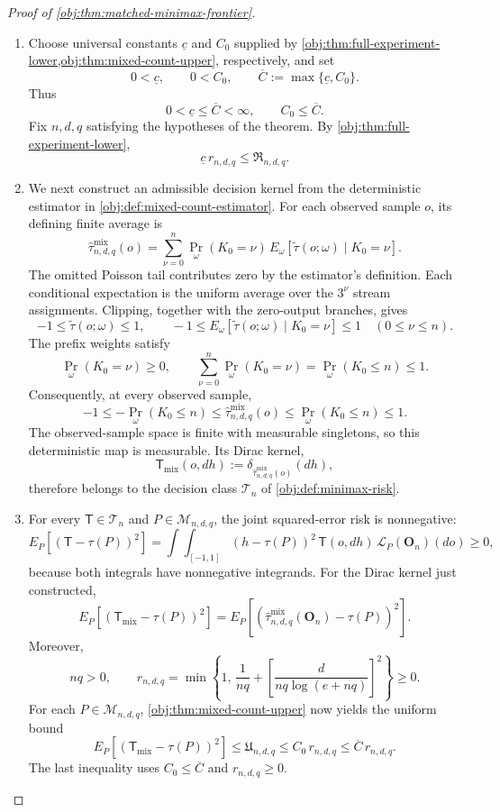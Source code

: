 \documentclass[11pt]{article}
\begin{document}
\begin{proof}[Proof of \cref{obj:thm:matched-minimax-frontier}]
\begin{enumerate}
\item Choose universal constants \(\underline c\) and \(C_0\) supplied by
\cref{obj:thm:full-experiment-lower,obj:thm:mixed-count-upper}, respectively, and set
\[
0<\underline c,\qquad 0<C_0,\qquad
\overline C:=\max\{\underline c,C_0\}.
\]
Thus
\[
0<\underline c\le\overline C<\infty,
\qquad C_0\le\overline C.
\]
Fix \(n,d,q\) satisfying the hypotheses of the theorem.
By \cref{obj:thm:full-experiment-lower},
\[
\underline c\,r_{n,d,q}\le\mathfrak R_{n,d,q}.
\]

\item We next construct an admissible decision kernel from the deterministic estimator in
\cref{obj:def:mixed-count-estimator}. For each observed sample \(o\), its defining finite average is
\[
\widehat\tau^{\mathrm{mix}}_{n,d,q}(o)
=
\sum_{\nu=0}^{n}
\Pr_\omega(K_0=\nu)\,
E_\omega\!\left[
\widetilde\tau(o;\omega)\mid K_0=\nu
\right].
\]
The omitted Poisson tail contributes zero by the estimator's definition.
Each conditional expectation is the uniform average over the \(3^\nu\) stream assignments.
Clipping, together with the zero-output branches, gives
\[
-1\le \widetilde\tau(o;\omega)\le1,
\qquad
-1\le
E_\omega\!\left[
\widetilde\tau(o;\omega)\mid K_0=\nu
\right]
\le1
\quad(0\le\nu\le n).
\]
The prefix weights satisfy
\[
\Pr_\omega(K_0=\nu)\ge0,\qquad
\sum_{\nu=0}^{n}\Pr_\omega(K_0=\nu)
=\Pr_\omega(K_0\le n)\le1.
\]
Consequently, at every observed sample,
\[
-1
\le-\Pr_\omega(K_0\le n)
\le\widehat\tau^{\mathrm{mix}}_{n,d,q}(o)
\le\Pr_\omega(K_0\le n)
\le1.
\]
The observed-sample space is finite with measurable singletons, so this deterministic map is measurable. Its Dirac kernel,
\[
\mathsf T_{\mathrm{mix}}(o,dh)
:=
\delta_{\widehat\tau^{\mathrm{mix}}_{n,d,q}(o)}(dh),
\]
therefore belongs to the decision class \(\mathcal T_n\) of
\cref{obj:def:minimax-risk}.

\item For every \(\mathsf T\in\mathcal T_n\) and \(P\in\mathcal M_{n,d,q}\), the joint squared-error risk is nonnegative:
\[
E_P\!\left[(\mathsf T-\tau(P))^2\right]
=
\int\!\int_{[-1,1]}
(h-\tau(P))^2\,\mathsf T(o,dh)\,
\mathcal L_P(\mathbf O_n)(do)
\ge0,
\]
because both integrals have nonnegative integrands. For the Dirac kernel just constructed,
\[
E_P\!\left[(\mathsf T_{\mathrm{mix}}-\tau(P))^2\right]
=
E_P\!\left[
\left(
\widehat\tau^{\mathrm{mix}}_{n,d,q}(\mathbf O_n)-\tau(P)
\right)^2
\right].
\]
Moreover,
\[
nq>0,\qquad
r_{n,d,q}
=
\min\left\{
1,\,
\frac1{nq}
+
\left[\frac{d}{nq\log(e+nq)}\right]^2
\right\}
\ge0.
\]
For each \(P\in\mathcal M_{n,d,q}\),
\cref{obj:thm:mixed-count-upper} now yields the uniform bound
\[
E_P\!\left[(\mathsf T_{\mathrm{mix}}-\tau(P))^2\right]
\le \mathfrak U_{n,d,q}
\le C_0\,r_{n,d,q}
\le\overline C\,r_{n,d,q}.
\]
The last inequality uses \(C_0\le\overline C\) and \(r_{n,d,q}\ge0\).


\end{enumerate}
\end{proof}
\end{document}
